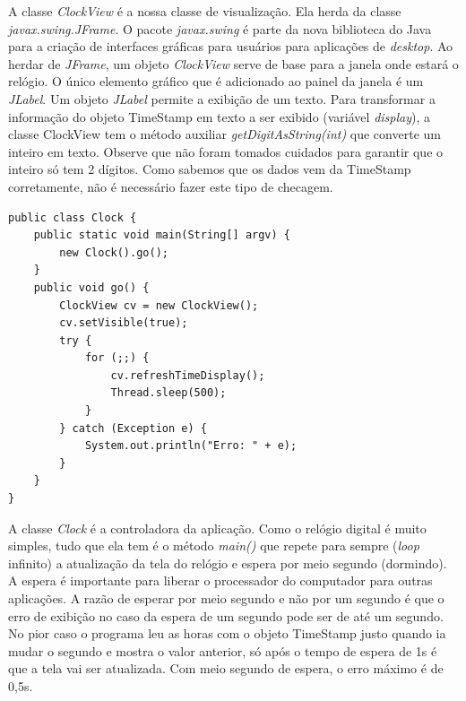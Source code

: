 \documentclass[
	11pt,				%
	openright,
	twoside,			%
	a4paper,			%
	english,			%
	french,
	brazil,				%
	sumario=tradicional
	]{abntex2}
\begin{document}
A classe \emph{ClockView} é a nossa classe de visualização. Ela herda da classe \emph{javax.swing.JFrame}. O pacote \emph{javax.swing} é parte da nova biblioteca do Java para a criação de interfaces gráficas para usuários para aplicações de \textit{desktop}. Ao herdar de \emph{JFrame}, um objeto \emph{ClockView} serve de base para a janela onde estará o relógio. O único elemento gráfico que é adicionado ao painel da janela é um \emph{JLabel}. Um objeto \emph{JLabel} permite a exibição de um texto. Para transformar a informação do objeto TimeStamp em texto a ser exibido (variável \emph{display}), a classe ClockView tem o método auxiliar \emph{getDigitAsString(int)} que converte um inteiro em texto. Observe que não foram tomados cuidados para garantir que o inteiro só tem 2 dígitos. Como sabemos que os dados vem da TimeStamp corretamente, não é necessário fazer este tipo de checagem.

\begin{verbatim}
public class Clock {
    public static void main(String[] argv) {
        new Clock().go();
    }
    public void go() {
        ClockView cv = new ClockView();
        cv.setVisible(true);
        try {
            for (;;) {
                cv.refreshTimeDisplay();
                Thread.sleep(500);
            }
        } catch (Exception e) {
            System.out.println("Erro: " + e);
        }
    }
}
\end{verbatim}

A classe \emph{Clock} é a controladora da aplicação. Como o relógio digital é muito simples, tudo que ela tem é o método \emph{main()} que repete para sempre (\emph{loop} infinito) a atualização da tela do relógio e espera por meio segundo (dormindo). A espera é importante para liberar o processador do computador para outras aplicações. A razão de esperar por meio segundo e não por um segundo é que o erro de exibição no caso da espera de um segundo pode ser de até um segundo. No pior caso o programa leu as horas com o objeto TimeStamp justo quando ia mudar o segundo e mostra o valor anterior, só após o tempo de espera de 1s é que a tela vai ser atualizada. Com meio segundo de espera, o erro máximo é de 0,5s.



% 
\end{document}
